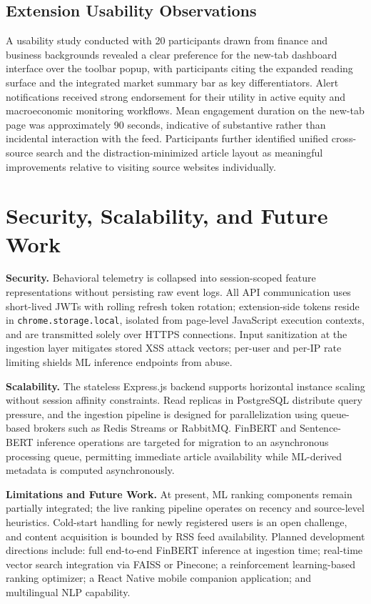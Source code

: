 \documentclass[conference]{IEEEtran}
\begin{document}
\subsection{Extension Usability Observations}
A usability study conducted with 20 participants drawn from finance and business backgrounds revealed a clear preference for the new-tab dashboard interface over the toolbar popup, with participants citing the expanded reading surface and the integrated market summary bar as key differentiators. Alert notifications received strong endorsement for their utility in active equity and macroeconomic monitoring workflows. Mean engagement duration on the new-tab page was approximately 90 seconds, indicative of substantive rather than incidental interaction with the feed. Participants further identified unified cross-source search and the distraction-minimized article layout as meaningful improvements relative to visiting source websites individually.

\section{Security, Scalability, and Future Work}

\textbf{Security.} Behavioral telemetry is collapsed into session-scoped feature representations without persisting raw event logs. All API communication uses short-lived JWTs with rolling refresh token rotation; extension-side tokens reside in \texttt{chrome.storage.local}, isolated from page-level JavaScript execution contexts, and are transmitted solely over HTTPS connections. Input sanitization at the ingestion layer mitigates stored XSS attack vectors; per-user and per-IP rate limiting shields ML inference endpoints from abuse.

\textbf{Scalability.} The stateless Express.js backend supports horizontal instance scaling without session affinity constraints. Read replicas in PostgreSQL distribute query pressure, and the ingestion pipeline is designed for parallelization using queue-based brokers such as Redis Streams or RabbitMQ. FinBERT and Sentence-BERT inference operations are targeted for migration to an asynchronous processing queue, permitting immediate article availability while ML-derived metadata is computed asynchronously.

\textbf{Limitations and Future Work.} At present, ML ranking components remain partially integrated; the live ranking pipeline operates on recency and source-level heuristics. Cold-start handling for newly registered users is an open challenge, and content acquisition is bounded by RSS feed availability. Planned development directions include: full end-to-end FinBERT inference at ingestion time; real-time vector search integration via FAISS or Pinecone; a reinforcement learning-based ranking optimizer; a React Native mobile companion application; and multilingual NLP capability.
\end{document}
